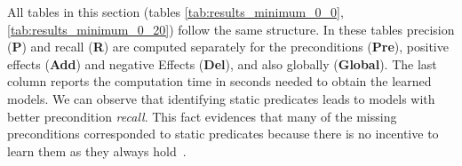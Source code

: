 All tables in this section (tables \ref{tab:results_minimum_0_0}, \ref{tab:results_minimum_0_20}) follow the same structure. In these tables precision ({\bf P}) and recall ({\bf R}) are computed separately for the preconditions ({\bf Pre}), positive effects ({\bf Add}) and negative Effects ({\bf Del}), and also globally ({\bf Global}). The last column reports the computation time in seconds needed to obtain the learned models. We can observe that identifying static predicates leads to models with better precondition {\em recall}. This fact evidences that many of the missing preconditions corresponded to static predicates because there is no incentive to learn them as they always hold~\cite{gregory2015domain}.

\begin{table}[hbt!]
		\begin{center}
			

\end{center}
\end{table}
